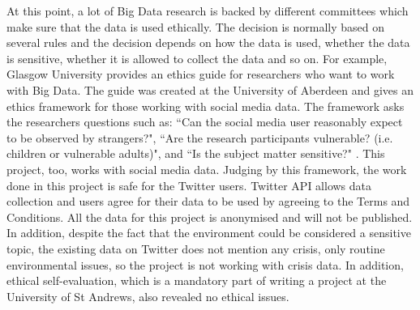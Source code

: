 At this point, a lot of Big Data research is backed by different committees which make sure that the data is used ethically. The decision is normally based on several rules and the decision depends on how the data is used, whether the data is sensitive, whether it is allowed to collect the data and so on. For example, Glasgow University provides an ethics guide for researchers who want to work with Big Data. The guide was created at the University of Aberdeen and gives an ethics framework for those working with social media data. The framework asks the researchers questions such as: ``Can the social media user reasonably expect to be observed by strangers?", ``Are the research participants vulnerable? (i.e. children or vulnerable adults)", and ``Is the subject matter sensitive?" \cite{ethicsguide}. 
This project, too, works with social media data. Judging by this framework, the work done in this project is safe for the Twitter users. Twitter API allows data collection and users agree for their data to be used by agreeing to the Terms and Conditions. All the data for this project is anonymised and will not be published. In addition, despite the fact that the environment could be considered a sensitive topic, the existing data on Twitter does not mention any crisis, only routine environmental issues, so the project is not working with crisis data. In addition, ethical self-evaluation, which is a mandatory part of writing a project at the University of St Andrews, also revealed no ethical issues. 

